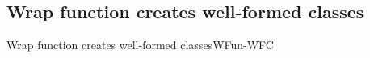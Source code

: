 \documentclass[acmlarge, anonymous, authordraft, review]{acmart} %
\begin{document}
\subsection*{Wrap function creates well-formed classes}

  \begin{theorem}{Wrap function creates well-formed classes}{WFun-WFC}
  
  \begin{conds}
   \cond{\WFq{\K~\e~\s}}
   \cond{\sp = \Map \s{\Bind\ap{\obj\D\a}}}
   \cond{\fresh\that}
  \end{conds}
  
  \then\axiom{\WF{}\sp{\K~\k}{\k}}
  

\end{theorem}
\end{document}
